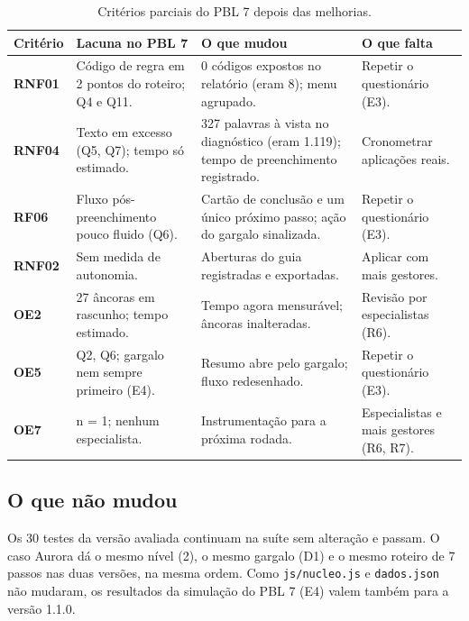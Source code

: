 \documentclass[11pt,a4paper]{article}
\newcommand{\thead}[1]{\sffamily\bfseries\small #1}
\begin{document}
\begin{table}[H]
\centering\small
\caption{Critérios parciais do PBL 7 depois das melhorias.}\label{tab:parciais}
\begin{tabularx}{\linewidth}{L{2.4cm}L{3.6cm}XL{2.9cm}}
\toprule
\thead{Critério} & \thead{Lacuna no PBL 7} & \thead{O que mudou} & \thead{O que falta} \\
\midrule
\textbf{RNF01} & Código de regra em 2 pontos do roteiro; Q4 e Q11. & 0 códigos expostos no relatório (eram 8); menu agrupado. & Repetir o questionário (E3). \\
\textbf{RNF04} & Texto em excesso (Q5, Q7); tempo só estimado. & 327 palavras à vista no diagnóstico (eram 1.119); tempo de preenchimento registrado. & Cronometrar aplicações reais. \\
\textbf{RF06} & Fluxo pós-preenchimento pouco fluido (Q6). & Cartão de conclusão e um único próximo passo; ação do gargalo sinalizada. & Repetir o questionário (E3). \\
\textbf{RNF02} & Sem medida de autonomia. & Aberturas do guia registradas e exportadas. & Aplicar com mais gestores. \\
\textbf{OE2} & 27 âncoras em rascunho; tempo estimado. & Tempo agora mensurável; âncoras inalteradas. & Revisão por especialistas (R6). \\
\textbf{OE5} & Q2, Q6; gargalo nem sempre primeiro (E4). & Resumo abre pelo gargalo; fluxo redesenhado. & Repetir o questionário (E3). \\
\textbf{OE7} & n = 1; nenhum especialista. & Instrumentação para a próxima rodada. & Especialistas e mais gestores (R6, R7). \\
\bottomrule
\end{tabularx}
\end{table}

\subsection{O que não mudou}
Os 30 testes da versão avaliada continuam na suíte sem alteração e passam. O caso Aurora dá o mesmo nível
(2), o mesmo gargalo (D1) e o mesmo roteiro de 7 passos nas duas versões, na mesma ordem. Como
\texttt{js/nucleo.js} e \texttt{dados.json} não mudaram, os resultados da simulação do PBL 7 (E4) valem também para a
versão 1.1.0.
\end{document}
